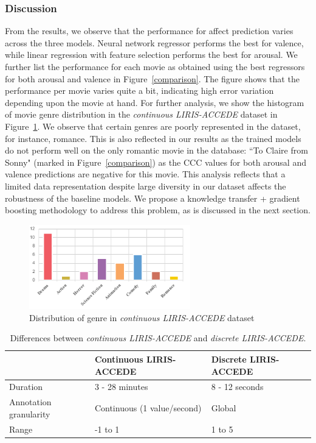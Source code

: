\documentclass{article}
\begin{document}
\begin{spacing}{0.9}
\subsubsection{Discussion} 
\vspace{-2mm}
From the results, we observe that the performance for affect prediction varies across the three models.
Neural network regressor performs the best for valence, while linear regression with feature selection performs the best for arousal.
We further list the performance for each movie as obtained using the best regressors for both arousal and valence in Figure~\ref{comparison}. 
The figure shows that the performance per movie varies quite a bit, indicating high error variation depending upon the movie at hand. 
For further analysis, we show the histogram of movie genre distribution in the {\it continuous LIRIS-ACCEDE} dataset in Figure~\ref{genre}.
We observe that certain genres are poorly represented in the dataset, for instance, romance.
This is also reflected in our results as the trained models do not perform well on the only romantic movie in the database: ``To Claire from Sonny" (marked in Figure~\ref{comparison}) as the CCC values for both arousal and valence predictions are negative for this movie. 
This analysis reflects that a limited data representation despite large diversity in our dataset affects the robustness of the baseline models.
We propose a knowledge transfer + gradient boosting methodology to address this problem, as is discussed in the next section.


\begin{figure}[t]
\centering
\vspace{-1mm}
\includegraphics[width=7cm]{genre2}
\vspace{-5mm}
\caption{Distribution of genre in {\it continuous LIRIS-ACCEDE} dataset}
\vspace{-5mm}
\label{genre}
\end{figure}

\begin{table}[t]
\centering
\caption{Differences between {\it continuous LIRIS-ACCEDE} and {\it discrete LIRIS-ACCEDE}.}
\begin{tabular}{l|p{2.2cm}|p{2.2cm}}\hline
				& Continuous LIRIS-ACCEDE	& Discrete LIRIS-ACCEDE \\ \hline
Duration			& 3 - 28 minutes			& 8 - 12 seconds		\\ \hline	
Annotation granularity & Continuous (1 value/second)				& Global 				\\ \hline
Range			& -1 to 1					& 1 to 5				\\ 
\end{tabular}
\vspace{-3mm}
\label{differences}
\end{table}


\end{spacing}
\end{document}
